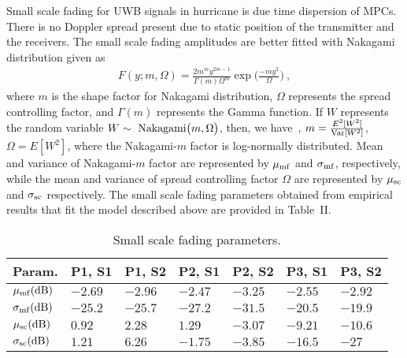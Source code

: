 \documentclass[conference]{IEEEtran}
\begin{document}
Small scale fading for UWB signals in hurricane is due time dispersion of MPCs. There is no Doppler spread present due to static position of the transmitter and the receivers. The small scale fading amplitudes are better fitted with Nakagami distribution given as 
\vspace{-0.09 cm}
\begin{align}
F(y;m,\Omega) = \frac{2m^my^{2m-1}}{\Gamma(m) \Omega^m}\exp\Big(\frac{-my^2}{\Omega}\Big)~,
\end{align}
where $m$ is the shape factor for Nakagami distribution, $\Omega$ represents the spread controlling factor, and $\Gamma(m)$ represents the Gamma function. If $W$ represents the random variable $W\sim~{\rm Nakagami}\big(m,\Omega\big)$, then, we have~\cite{kolar}, 
$m =\frac{ E^2[W^2]}{{\rm Var}[W^2]}$, $\Omega = E[W^2]$, where the Nakagami-$m$ factor is log-normally distributed. Mean and variance of Nakagami-$m$ factor are represented by $\mu_{\rm mf}$ and $\sigma_{\rm mf}$, respectively, while the mean and variance of spread controlling factor $\Omega$ are represented by $\mu_{\rm sc}$ and $\sigma_{\rm sc}$ respectively. The small scale fading parameters obtained from empirical results that fit the model described above are provided in Table~II. 
\begin{table}[!t]
	\begin{center}		
		\caption{Small scale fading parameters.}\label{Table_III}
        \vspace{-0.5 cm}
		\begin{tabular}{|P{1cm}|P{0.82cm}|P{0.82cm}|P{0.82cm}|P{0.82cm}|P{0.82cm}|P{0.82cm}|}
			\hline
			\textbf{Param.}&\textbf{P1, S1}&\textbf{P1, S2}&\textbf{P2, S1}&\textbf{P2, S2}&\textbf{P3, S1}&\textbf{P3, S2}\\
			\hline
			$\mu_{\rm mf}(\rm dB)$&$-2.69$&$-2.96$&$-2.47$&$-3.25$&$-2.55$&$-2.92$ \\
			\hline	
			$\sigma_{\rm mf}(\rm dB)$&$-25.2$&$-25.7$&$-27.2$&$-31.5$&$-20.5$&$-19.9$ \\
			\hline	
			$\mu_{\rm sc}(\rm dB)$&$0.92$&$2.28$&$1.29$&$-3.07$&$-9.21$&$-10.6$ \\
			\hline	
			$\sigma_{\rm sc}(\rm dB) $&$1.21$&$6.26$&$-1.75$&$-3.85$&$-16.5$&$-27$ \\
			\hline	
		  \end{tabular}
		\end{center}
        \vspace{-0.4 cm}
 \end{table}
\end{document}
